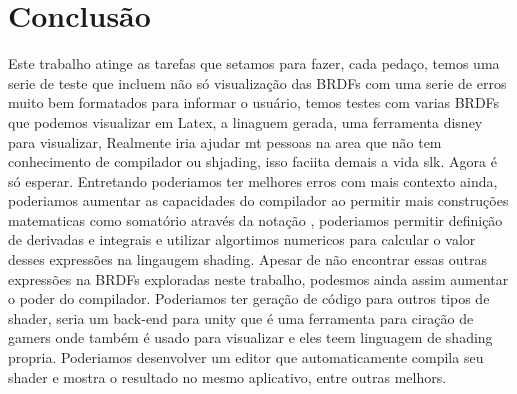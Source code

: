 
\chapter{Conclusão}

Este trabalho atinge as tarefas que setamos para fazer, cada pedaço, temos uma serie de teste que incluem não só visualização das BRDFs com uma serie de erros muito bem formatados para informar o usuário, temos testes com varias BRDFs que podemos visualizar em Latex, a linaguem gerada, uma ferramenta disney para visualizar, Realmente iria ajudar mt pessoas na area que não tem conhecimento de compilador ou shjading, isso faciita demais a vida slk. Agora é só esperar.
Entretando poderiamos ter melhores erros com mais contexto ainda, poderiamos aumentar as capacidades do compilador ao permitir mais construções matematicas como somatório através da notação \Sigmas, poderiamos permitir definição de derivadas e integrais e utilizar algortimos numericos para calcular o valor desses expressões na lingaugem shading.  Apesar de não encontrar essas outras expressões na BRDFs exploradas neste trabalho, podesmos ainda assim aumentar o poder do compilador. Poderiamos ter geração de código para outros tipos de shader, seria um back-end para unity que é uma ferramenta para ciração de gamers onde também é usado para visualizar e eles teem linguagem de shading propria. Poderiamos desenvolver um editor que automaticamente compila seu shader e mostra o resultado no mesmo aplicativo, entre outras melhors. 
